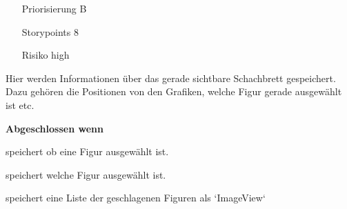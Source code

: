 \begin{itemize}
\item[Priorisierung] B
\item[Storypoints] 8
\item[Risiko] high
\end{itemize}

Hier werden Informationen über das gerade sichtbare Schachbrett gespeichert. Dazu gehören die Positionen von den Grafiken, welche Figur gerade ausgewählt ist etc.

\textbf{Abgeschlossen wenn}
\begin{todolist}
    \item[\done]  speichert ob eine Figur ausgewählt ist.
  \item[\done]  speichert welche Figur ausgewählt ist.
  \item[\done]  speichert eine Liste der geschlagenen Figuren als `ImageView`

\end{todolist}

